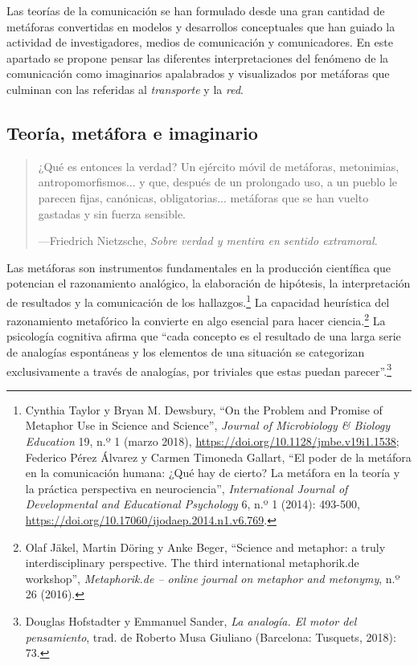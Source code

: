 \documentclass{tufte-handout}
\begin{document}
Las teorías de la comunicación se han formulado desde una gran cantidad
de metáforas convertidas en modelos y desarrollos conceptuales que han
guiado la actividad de investigadores, medios de comunicación y
comunicadores. En este apartado se propone pensar las diferentes
interpretaciones del fenómeno de la comunicación como imaginarios
apalabrados y visualizados por metáforas que culminan con las referidas
al \emph{transporte} y la \emph{red}.

\hypertarget{teora-metfora-e-imaginario}{%
\subsection{Teoría, metáfora e
imaginario}\label{teora-metfora-e-imaginario}}

\begin{quote}
¿Qué es entonces la verdad? Un ejército móvil de metáforas, metonimias,
antropomorfismos... y que, después de un prolongado uso, a un pueblo le
parecen fijas, canónicas, obligatorias... metáforas que se han vuelto
gastadas y sin fuerza sensible.

---Friedrich Nietzsche, \emph{Sobre verdad y mentira en sentido
extramoral}.
\end{quote}

Las metáforas son instrumentos fundamentales en la producción científica
que potencian el razonamiento analógico, la elaboración de hipótesis, la
interpretación de resultados y la comunicación de los
hallazgos.\footnote{Cynthia Taylor y Bryan M. Dewsbury, ``On the Problem
  and Promise of Metaphor Use in Science and Science'', \emph{Journal of
  Microbiology \& Biology Education} 19, n.º 1 (marzo 2018),
  \url{https://doi.org/10.1128/jmbe.v19i1.1538}; Federico Pérez Álvarez
  y Carmen Timoneda Gallart, ``El poder de la metáfora en la
  comunicación humana: ¿Qué hay de cierto? La metáfora en la teoría y la
  práctica perspectiva en neurociencia'', \emph{International Journal of
  Developmental and Educational Psychology} 6, n.º 1 (2014): 493-500,
  \url{https://doi.org/10.17060/ijodaep.2014.n1.v6.769}.} La capacidad
heurística del razonamiento metafórico la convierte en algo esencial
para hacer ciencia.\footnote{Olaf Jäkel, Martin Döring y Anke Beger,
  ``Science and metaphor: a truly interdisciplinary perspective. The
  third international metaphorik.de workshop'', \emph{Metaphorik.de --
  online journal on metaphor and metonymy}, n.º 26 (2016).}
La psicología cognitiva afirma que ``cada concepto es el resultado de
una larga serie de analogías espontáneas y los elementos de una
situación se categorizan exclusivamente a través de analogías, por
triviales que estas puedan parecer''.\footnote{Douglas Hofstadter y
  Emmanuel Sander, \emph{La analogía. El motor del pensamiento}, trad.
  de Roberto Musa Giuliano (Barcelona: Tusquets, 2018): 73.}
\end{document}
